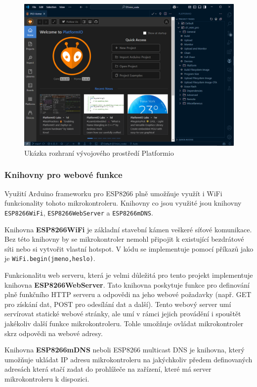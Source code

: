 \begin{figure}[hptb]
    \centering
    \includegraphics[width=0.9\linewidth]{images/Platformio_Ukazka.png}
    \caption{Ukázka rozhraní vývojového prostředí Platformio}
    \label{fig:PlatformioUkazka}
\end{figure}

\subsubsection{Knihovny pro webové funkce}

Využití Arduino frameworku pro ESP8266 plně umožňuje využít i WiFi funkcionality tohoto mikrokontroleru. Knihovny co jsou využité jsou knihovny \texttt{ESP8266WiFi}, \texttt{ESP8266WebServer} a \texttt{ESP8266mDNS}.

Knihovna \textbf{ESP8266WiFi} je základní stavební kámen veškeré síťové komunikace. Bez této knihovny by se mikrokontroler nemohl připojit k existující bezdrátové síti nebo si vytvořit vlastní hotspot. V kódu se implementuje pomocí příkazů jako je \texttt{WiFi.begin(jmeno,heslo)}.

Funkcionalitu web serveru, která je velmi důležitá pro tento projekt implementuje knihovna \textbf{ESP8266WebServer}. Tato knihovna poskytuje funkce pro definování plně funkčního HTTP serveru a odpovědi na jeho webové požadavky (např. GET pro získání dat, POST pro odesílání dat a další). Tento webový server umí servírovat statické webové stránky, ale umí v rámci jejich provádění i spouštět jakékoliv další funkce mikrokontroleru. Tohle umožňuje ovládat mikrokontroler skrz odpovědi na webové adresy.

Knihovna \textbf{ESP8266mDNS} neboli ESP8266 multicast DNS je knihovna, který umožňuje ukládat IP adresu mikrokontroleru na jakýchkoliv předem definovaných adresách která stačí zadat do prohlížeče na zařízení, které má server mikrokontroleru k dispozici.

